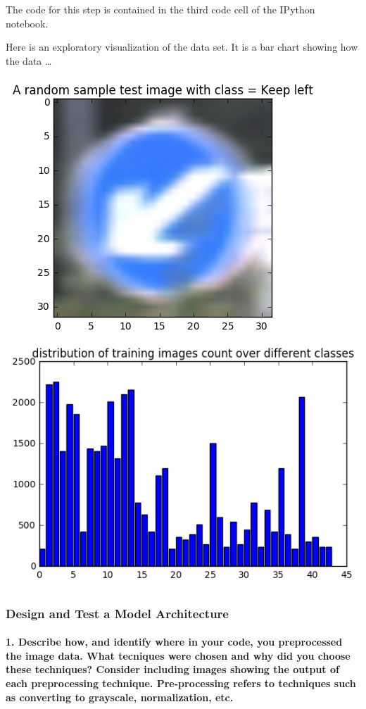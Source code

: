 \documentclass[11pt]{article}
\makeatletter
\def\maxwidth{\ifdim\Gin@nat@width>\linewidth\linewidth
    \else\Gin@nat@width\fi}
\let\Oldincludegraphics\includegraphics
\renewcommand{\includegraphics}[1]{\Oldincludegraphics[width=.8\maxwidth]{#1}}
\makeatother
\begin{document}
The code for this step is contained in the third code cell of the
IPython notebook.

Here is an exploratory visualization of the data set. It is a bar chart
showing how the data \ldots{}

\includegraphics{./examples/example-sign.png}
\includegraphics{./examples/visualization.png}

\subsubsection{Design and Test a Model
Architecture}\label{design-and-test-a-model-architecture}

\paragraph{1. Describe how, and identify where in your code, you
preprocessed the image data. What tecniques were chosen and why did you
choose these techniques? Consider including images showing the output of
each preprocessing technique. Pre-processing refers to techniques such
as converting to grayscale, normalization,
etc.}\label{describe-how-and-identify-where-in-your-code-you-preprocessed-the-image-data.-what-tecniques-were-chosen-and-why-did-you-choose-these-techniques-consider-including-images-showing-the-output-of-each-preprocessing-technique.-pre-processing-refers-to-techniques-such-as-converting-to-grayscale-normalization-etc.}
\end{document}
